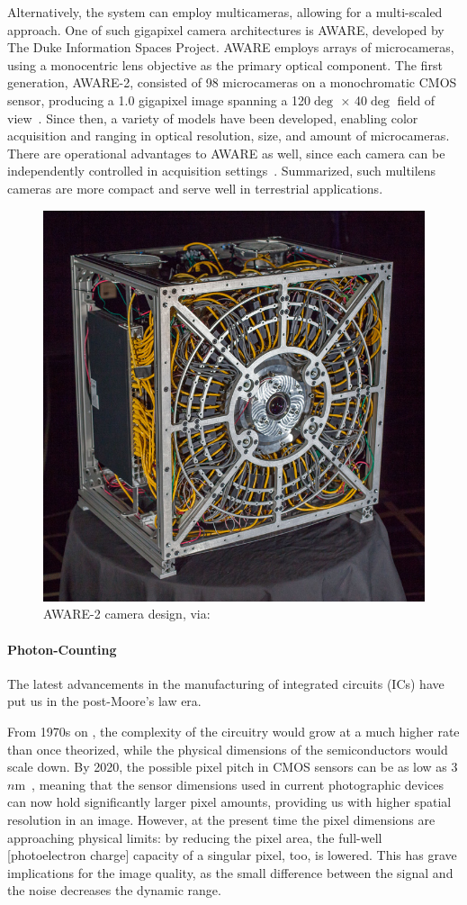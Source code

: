Alternatively, the system can employ multicameras, allowing for a multi-scaled approach. One of such gigapixel camera architectures is AWARE, developed by The Duke Information Spaces Project. AWARE employs arrays of microcameras, using a monocentric lens objective as the primary optical component. The first generation, AWARE-2, consisted of 98 microcameras on a monochromatic CMOS sensor, producing a 1.0 gigapixel image spanning a 120$\deg$ × 40$\deg$ field of view~\cite{GongGPU}. Since then, a variety of models have been developed, enabling color acquisition and ranging in optical resolution, size, and amount of microcameras. There are operational advantages to AWARE as well, since each camera can be independently controlled in acquisition settings~\cite{multiscale}. Summarized, such multilens cameras are more compact and serve well in terrestrial applications. \cite{aware2}

 \begin{figure}[h]
  \centering
  \includegraphics[width=0.5\linewidth]{imgs/aware.jpg}
  \caption{AWARE-2 camera design, via: \cite{physics_world_2018}}
\end{figure}

\paragraph{Photon-Counting}
The latest advancements in the manufacturing of integrated circuits (ICs) have put us in the post-Moore's law era. 

From 1970s on \cite{Cerofolini2007}, the complexity of the circuitry would grow at a much higher rate than once theorized, while the physical dimensions of the semiconductors would scale down. By 2020, the possible pixel pitch in CMOS sensors can be as low as 3$n$m~\cite{hao2021recent}, meaning that the sensor dimensions used in current photographic devices can now hold significantly larger pixel amounts, providing us with higher spatial resolution in an image. However, at the present time the pixel dimensions are approaching physical limits: by reducing the pixel area, the full-well [photoelectron charge] capacity of a singular pixel, too, is lowered. This has grave implications for the image quality, as the small difference between the signal and the noise decreases the dynamic range. 


